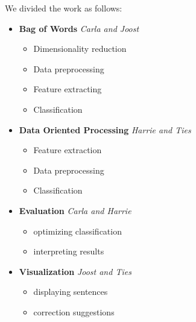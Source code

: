 \documentclass[11pt, english]{article}
\begin{document}
We divided the work as follows:
\begin{itemize}
\item \textbf{Bag of Words} \emph{Carla and Joost}
	\begin{itemize}
		\item Dimensionality reduction
		\item Data preprocessing
		\item Feature extracting
		\item Classification
	\end{itemize}

\item \textbf{Data Oriented Processing} \emph{Harrie and Ties}
	\begin{itemize}
		\item Feature extraction
		\item Data preprocessing
		\item Classification
	\end{itemize}

\item \textbf{Evaluation} \emph{Carla and Harrie}
	\begin{itemize}
		\item optimizing classification
		\item interpreting results
	\end{itemize}

\item \textbf{Visualization} \emph{Joost and Ties}
	\begin{itemize}
		\item displaying sentences
		\item correction suggestions
	\end{itemize}

\end{itemize}
\end{document}
